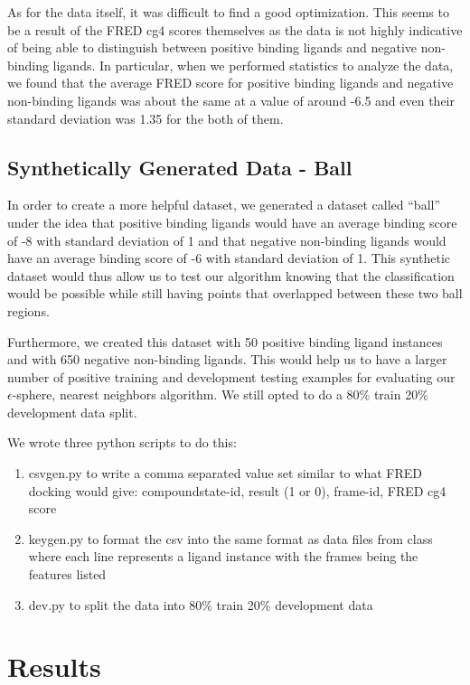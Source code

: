 \documentclass[11pt,letterpaper]{article}
\begin{document}
As for the data itself, it was difficult to find a good optimization.  This seems to be a result of the FRED cg4 scores themselves as the data is not highly indicative of being able to distinguish between positive binding ligands and negative non-binding ligands.  In particular, when we performed statistics to analyze the data, we found that the average FRED score for positive binding ligands and negative non-binding ligands was about the same at a value of around -6.5 and even their standard deviation was 1.35 for the both of them.

\subsection{Synthetically Generated Data - Ball}
In order to create a more helpful dataset, we generated a dataset called ``ball'' under the idea that positive binding ligands would have an average binding score of -8 with standard deviation of 1 and that negative non-binding ligands would have an average binding score of -6 with standard deviation of 1.  This synthetic dataset would thus allow us to test our algorithm knowing that the classification would be possible while still having points that overlapped between these two ball regions.

Furthermore, we created this dataset with 50 positive binding ligand instances and with 650 negative non-binding ligands.  This would help us to have a larger number of positive training and development testing examples for evaluating our $\epsilon$-sphere, nearest neighbors algorithm.  We still opted to do a 80\% train 20\% development data split.

We wrote three python scripts to do this: 

\begin{enumerate} 	
	\item csvgen.py to write a comma separated value set similar to what FRED docking would give: compoundstate-id, result (1 or 0), frame-id, FRED cg4 score
	\item keygen.py to format the csv into the same format as data files from class where each line represents a ligand instance with the frames being the features listed
	\item dev.py to split the data into 80\% train 20\% development data
\end{enumerate}

\section{Results}
\end{document}
